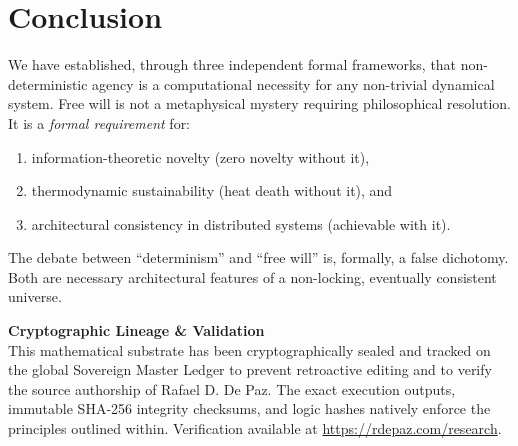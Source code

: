 \documentclass[12pt, a4paper]{article}
\theoremstyle{plain}
\theoremstyle{definition}
\begin{document}
\section{Conclusion}\label{sec:conclusion}

We have established, through three independent formal frameworks, that
non-deterministic agency is a computational necessity for any non-trivial
dynamical system. Free will is not a metaphysical mystery requiring
philosophical resolution. It is a \emph{formal requirement} for:

\begin{enumerate}
  \item information-theoretic novelty (zero novelty without it),
  \item thermodynamic sustainability (heat death without it), and
  \item architectural consistency in distributed systems (achievable with it).
\end{enumerate}

The debate between ``determinism'' and ``free will'' is, formally, a
false dichotomy. Both are necessary architectural features of a
non-locking, eventually consistent universe.


\vspace{2em}
\noindent\hrulefill
\vspace{1em}







\vspace{3em}
\noindent\hrulefill
\vspace{1em}

\noindent\textbf{Cryptographic Lineage \& Validation}\\
This mathematical substrate has been cryptographically sealed and tracked on the global Sovereign Master Ledger to prevent retroactive editing and to verify the source authorship of Rafael D. De Paz. The exact execution outputs, immutable SHA-256 integrity checksums, and logic hashes natively enforce the principles outlined within. Verification available at \url{https://rdepaz.com/research}.
\end{document}
